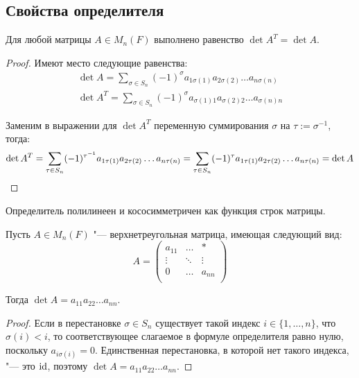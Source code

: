 \subsection{Свойства определителя}
	
\begin{theorem}
	Для любой матрицы $A \in M_n(F)$ выполнено равенство $\det{A^T} = \det{A}$.
\end{theorem}

\begin{proof}
	Имеют место следующие равенства:
	\begin{gather*}
		\det{A} = \sum_{\sigma \in S_n}(-1)^\sigma a_{1\sigma(1)}a_{2\sigma(2)}\dots a_{n\sigma(n)}\\
		\det{A^T} = \sum_{\sigma \in S_n}(-1)^\sigma a_{\sigma(1)1}a_{\sigma(2)2}\dots a_{\sigma(n)n}
	\end{gather*}
	
	Заменим в выражении для $\det{A^T}$ переменную суммирования $\sigma$ на $\tau := \sigma^{-1}$, тогда:
	\[\det{A^T} = \sum_{\tau \in S_n}(-1)^{\tau^{-1}} a_{1\tau(1)}a_{2\tau(2)}\dots a_{n\tau(n)} = \sum_{\tau \in S_n}(-1)^{\tau} a_{1\tau(1)}a_{2\tau(2)}\dots a_{n\tau(n)} = \det A\qedhere\]
\end{proof}

\begin{corollary}
	Определитель полилинеен и кососимметричен как функция строк матрицы.
\end{corollary}

\begin{proposition}
	Пусть $A \in M_n(F)$ "--- верхнетреугольная матрица, имеющая следующий вид:
	\[A = \begin{pmatrix}
	a_{11} & \dots & *\\ 
	\vdots & \ddots & \vdots\\
	0 & \dots & a_{nn}\\
	\end{pmatrix}\]
	
	Тогда $\det{A} = a_{11}a_{22}\dots a_{nn}$.
\end{proposition}

\begin{proof}
	Если в перестановке $\sigma \in S_n$ существует такой индекс $i \in \{1, \dots, n\}$, что $\sigma(i) < i$, то соответствующее слагаемое в формуле определителя равно нулю, поскольку $a_{i \sigma(i)} = 0$. Единственная перестановка, в которой нет такого индекса, "--- это $\mathrm{id}$, поэтому $\det{A} = a_{11}a_{22}\dots a_{nn}$.
\end{proof}

